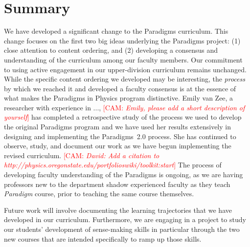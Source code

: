 \documentclass[english,aps,pra,reprint,noshowpacs,superscriptaddress]{revtex4-1}
\newcommand\corinnesays[1]{\textcolor{red}{[\sc CAM: {\em#1}]}}
\begin{document}

\section{Summary}
We have developed a significant change to the Paradigms
curriculum.  This change focuses on the first two big ideas underlying
the Paradigms project: (1) close attention to content ordering, and (2)
developing a consensus and understanding of the curriculum among our
faculty members.  Our commitment to using active engagement in our
upper-division curriculum remains unchanged.  While the specific
content ordering we developed may be interesting, the \emph{process} by
which we reached it and developed a faculty consensus is at the
essence of what makes the Paradigms in Physics program distinctive.
Emily van Zee, a researcher with experience in ..., 
\corinnesays{Emily, please add a short description of yourself} 
has completed a retrospective study of the process we used to develop the 
original Paradigms program and we have used her results extensively in 
designing and implementing the Paradigms~2.0 process.  She has continued 
to observe, study, and document our work as we have begun implementing 
the revised curriculum. 
\corinnesays{David:  Add a citation to http://physics.oregonstate.edu/portfolioswiki/toolkit:start}
The process of developing faculty understanding of the Paradigms is
ongoing, as we are having professors new to the department shadow
experienced faculty as they teach \emph{Paradigm} course, prior to teaching
the same course themselves.  

Future work will involve documenting the learning trajectories that we
have developed in our curriculum.  Furthermore, we are engaging in a
project to study our students' development of sense-making skills in
particular through the two new courses that are intended specifically
to ramp up those skills.
\end{document}
